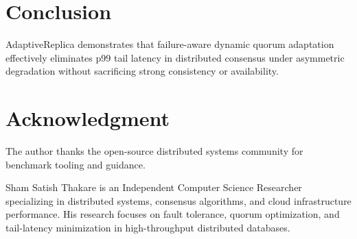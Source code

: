 \documentclass[journal]{IEEEtran}
\begin{document}
\section{Conclusion}
AdaptiveReplica demonstrates that failure-aware dynamic quorum adaptation effectively eliminates p99 tail latency in distributed consensus under asymmetric degradation without sacrificing strong consistency or availability.

\section*{Acknowledgment}
The author thanks the open-source distributed systems community for benchmark tooling and guidance.




\begin{IEEEbiographynophoto}{Sham Satish Thakare}
is an Independent Computer Science Researcher specializing in distributed systems, consensus algorithms, and cloud infrastructure performance. His research focuses on fault tolerance, quorum optimization, and tail-latency minimization in high-throughput distributed databases.
\end{IEEEbiographynophoto}
\end{document}
